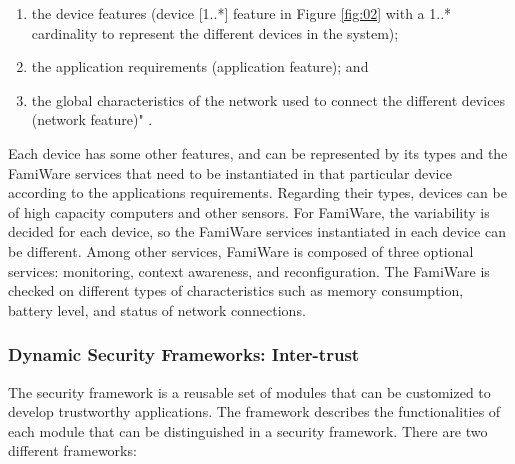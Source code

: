 \documentclass[12pt,a4paper,twoside]{report}
\begin{document}
\begin{enumerate}
	\item  the device features (device [1..*] feature in Figure \ref{fig:02} with a 1..* cardinality to represent the different devices in the system); 
	\item the application requirements (application feature); and 
	\item the global characteristics of the network used to connect the different devices (network feature)" \cite{Pinto;etal:2013}.
\end{enumerate}
Each device has some other features, and can be represented by its types and the FamiWare services that need to be instantiated in that particular device according to the applications requirements. Regarding their types, devices can be of high capacity computers and other sensors. For FamiWare, the variability is decided for each device, so the FamiWare services instantiated in each device can be different. Among other services, FamiWare is composed of three optional services: monitoring, context awareness, and reconfiguration. The FamiWare is checked on different types of characteristics such as memory consumption, battery level, and status of network connections.\par
\subsubsection{Dynamic Security Frameworks: Inter-trust}

The security framework is a reusable set of modules that can be customized to develop trustworthy applications. The framework describes the functionalities of each module that can be distinguished in a security framework. There are two different frameworks:\par
\end{document}
